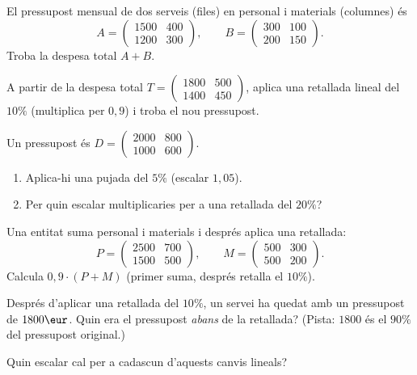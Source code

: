 \begin{exercicis}
\begin{exlist}
  \item El pressupost mensual de dos serveis (files) en personal i materials
        (columnes) és
        \[ A=\begin{pmatrix} 1500 & 400 \\ 1200 & 300 \end{pmatrix},\qquad
           B=\begin{pmatrix} 300 & 100 \\ 200 & 150 \end{pmatrix}. \]
        Troba la despesa total $A+B$.
  \item A partir de la despesa total $T=\begin{pmatrix} 1800 & 500 \\ 1400 & 450 \end{pmatrix}$,
        aplica una retallada lineal del $10\%$ (multiplica per $0{,}9$) i troba el
        nou pressupost.
  \item Un pressupost és $D=\begin{pmatrix} 2000 & 800 \\ 1000 & 600 \end{pmatrix}$.
        \begin{enumerate}[label=\alph*), leftmargin=1.6em, topsep=2pt]
          \item Aplica-hi una pujada del $5\%$ (escalar $1{,}05$).
          \item Per quin escalar multiplicaries per a una retallada del $20\%$?
        \end{enumerate}
  \item Una entitat suma personal i materials i després aplica una retallada:
        \[ P=\begin{pmatrix} 2500 & 700 \\ 1500 & 500 \end{pmatrix},\qquad
           M=\begin{pmatrix} 500 & 300 \\ 500 & 200 \end{pmatrix}. \]
        Calcula $0{,}9\cdot(P+M)$ (primer suma, després retalla el $10\%$).
  \item Després d'aplicar una retallada del $10\%$, un servei ha quedat amb un
        pressupost de $1800\eur$. Quin era el pressupost \emph{abans} de la
        retallada? (Pista: $1800$ és el $90\%$ del pressupost original.)
  \item Quin escalar cal per a cadascun d'aquests canvis lineals?

\end{exlist}
\end{exercicis}
